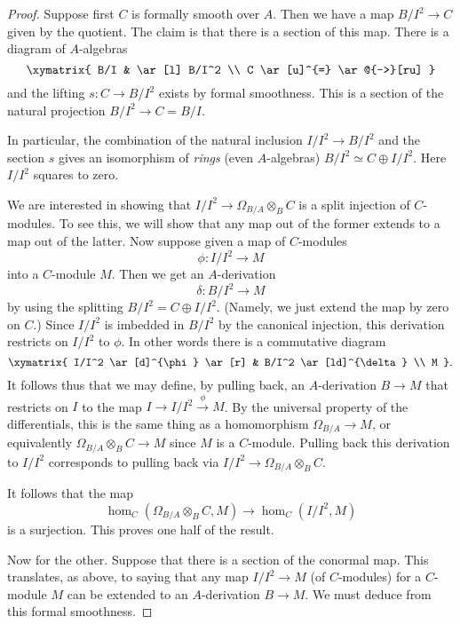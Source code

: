 \begin{proof} 
Suppose first $C$ is formally smooth over $A$.
Then we have a map
\( B/I^2 \to C  \)
given by the quotient. The claim is that there is a section of this map.
There is a diagram of $A$-algebras
\[ \xymatrix{
B/I & \ar[l] B/I^2 \\
C \ar[u]^{=} \ar@{-->}[ru]
}\]
and the lifting $s: C \to B/I^2$ exists by formal smoothness. 
This is a section of the natural projection $B/I^2 \to C = B/I$.


In particular, the combination of the natural inclusion $I/I^2 \to B/I^2$ and
the section $s$ gives an isomorphism  of \emph{rings} (even $A$-algebras)
\( B/I^2 \simeq C \oplus I/I^2 . \)
Here $I/I^2$ squares to zero.

We are interested in showing that $I/I^2 \to \Omega_{B/A} \otimes_B C$ is a
split injection of $C$-modules. To see this, we will show that any map out of the former
extends to a map out of the latter.
Now suppose given a map
of $C$-modules
\[ \phi:  I/I^2 \to M \]
into a $C$-module $M$.
Then we get an $A$-derivation
\[ \delta:  B/I^2 \to M  \]
by using the splitting $B/I^2 = C \oplus I/I^2$.
(Namely, we just extend the map by zero on $C$.)
Since $I/I^2$ is imbedded in $B/I^2$ by the canonical injection, this
derivation restricts on $I/I^2$ to $\phi$. In other words there is a
commutative diagram
\[ \xymatrix{
I/I^2 \ar[d]^{\phi}  \ar[r] &  B/I^2 \ar[ld]^{\delta} \\
M
}.\]
It follows thus that we may define, by pulling back, an $A$-derivation $B \to
M$ that restricts on $I$ to the map $I \to I/I^2 \stackrel{\phi}{\to} M$. 
By the universal property of the differentials, this is the same thing as a
homomorphism $\Omega_{B/A} \to M$, or equivalently $\Omega_{B/A} \otimes_B C
\to M$ since $M$ is a $C$-module.
Pulling back this derivation to $I/I^2$ corresponds to pulling back via $I/I^2
\to \Omega_{B/A} \otimes_B C$.

It follows that the map
\[ \hom_C(\Omega_{B/A} \otimes_B C, M) \to \hom_C(I/I^2, M)  \]
is a surjection. This proves one half of the result.

Now for the other.
Suppose that there is a section of the conormal map.
This translates, as above, to saying that
any map $I/I^2 \to M$  (of $C$-modules) for a $C$-module $M$
 can be extended to an $A$-derivation $B \to M$.
We must deduce from this formal smoothness.


\end{proof}
